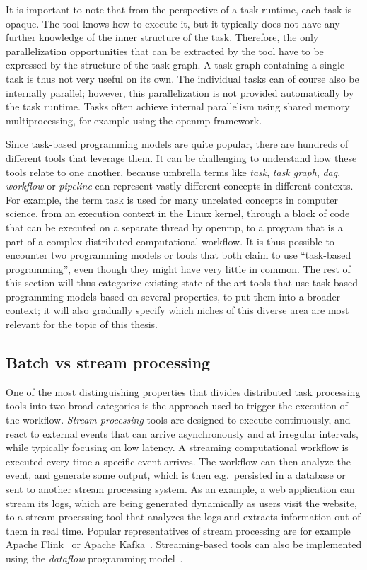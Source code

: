It is important to note that from the perspective of a task runtime, each task is opaque. The tool
knows how to execute it, but it typically does not have any further knowledge of the inner
structure of the task. Therefore, the only parallelization opportunities that can be extracted by
the tool have to be expressed by the structure of the task graph. A task graph containing a single
task is thus not very useful on its own. The individual tasks can of course also be internally
parallel; however, this parallelization is not provided automatically by the task runtime. Tasks
often achieve internal parallelism using shared memory multiprocessing, for example using the
\gls{openmp} framework.

Since task-based programming models are quite popular, there are hundreds of different tools that
leverage them. It can be challenging to understand how these tools relate to one another, because
umbrella terms like \emph{task}, \emph{task graph}, \emph{\gls{dag}},
\emph{workflow} or \emph{pipeline} can represent vastly different concepts in
different contexts. For example, the term task is used for many unrelated concepts in computer
science, from an execution context in the Linux kernel, through a block of code that can be
executed on a separate thread by \gls{openmp}, to a program that is a part of a complex
distributed computational workflow. It is thus possible to encounter two programming models or
tools that both claim to use ``task-based programming'', even though they might have very little in
common. The rest of this section will thus categorize existing state-of-the-art tools that use
task-based programming models based on several properties, to put them into a broader context; it
will also gradually specify which niches of this diverse area are most relevant for the topic of
this thesis.

\subsection{Batch vs stream processing}
One of the most distinguishing properties that divides distributed task processing tools into two
broad categories is the approach used to trigger the execution of the workflow.
\emph{Stream processing} tools are designed to execute continuously, and react to external events
that can arrive asynchronously and at irregular intervals, while typically focusing on low latency.
A streaming computational workflow is executed every time a specific event arrives. The workflow
can then analyze the event, and generate some output, which is then e.g.\ persisted in a database
or sent to another stream processing system. As an example, a web application can stream its logs,
which are being generated dynamically as users visit the website, to a stream processing tool that
analyzes the logs and extracts information out of them in real time. Popular representatives of
stream processing are for example Apache Flink~\cite{flink} or Apache
Kafka~\cite{kafka}. Streaming-based tools can also be implemented using the
\emph{dataflow} programming model~\cite{dataflow,timely_dataflow}.

